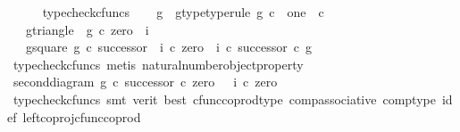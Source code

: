 \begin{isabellebody}
\ \ \ \ \isamarkupfalse%
\ typecheck{\isacharunderscore}{\kern0pt}cfuncs\isanewline
\ \ \isamarkupfalse%
\ g\ \ g{\isacharunderscore}{\kern0pt}type{\isacharbrackleft}{\kern0pt}type{\isacharunderscore}{\kern0pt}rule{\isacharbrackright}{\kern0pt}{\isacharcolon}{\kern0pt}\ {\isachardoublequoteopen}g{\isacharcolon}{\kern0pt}\ {\isasymnat}\isactrlsub c\ {\isasymrightarrow}\ {\isacharparenleft}{\kern0pt}one\ {\isasymCoprod}\ {\isasymnat}\isactrlsub c{\isacharparenright}{\kern0pt}{\isachardoublequoteclose}\ \isanewline
\ \ \ g{\isacharunderscore}{\kern0pt}triangle{\isacharcolon}{\kern0pt}\ {\isachardoublequoteopen}\ g\ {\isasymcirc}\isactrlsub c\ zero\ {\isacharequal}{\kern0pt}\ i{}{\isachardoublequoteclose}\ \isanewline
\ \ \ g{\isacharunderscore}{\kern0pt}square{\isacharcolon}{\kern0pt}\ {\isachardoublequoteopen}g\ {\isasymcirc}\isactrlsub c\ successor\ {\isacharequal}{\kern0pt}\ {\isacharparenleft}{\kern0pt}{\isacharparenleft}{\kern0pt}i{}\ {\isasymcirc}\isactrlsub c\ zero{\isacharparenright}{\kern0pt}\ {\isasymamalg}\ {\isacharparenleft}{\kern0pt}i{}\ {\isasymcirc}\isactrlsub c\ successor{\isacharparenright}{\kern0pt}{\isacharparenright}{\kern0pt}\ {\isasymcirc}\isactrlsub c\ g{\isachardoublequoteclose}\isanewline
\ \ \ \ \isamarkupfalse%
\ {\isacharparenleft}{\kern0pt}typecheck{\isacharunderscore}{\kern0pt}cfuncs{\isacharcomma}{\kern0pt}\ metis\ natural{\isacharunderscore}{\kern0pt}number{\isacharunderscore}{\kern0pt}object{\isacharunderscore}{\kern0pt}property{\isacharparenright}{\kern0pt}\isanewline
\ \ \isamarkupfalse%
\ \isamarkupfalse%
\ second{\isacharunderscore}{\kern0pt}diagram{}{\isacharcolon}{\kern0pt}\ {\isachardoublequoteopen}g\ {\isasymcirc}\isactrlsub c\ {\isacharparenleft}{\kern0pt}successor\ {\isasymcirc}\isactrlsub c\ zero{\isacharparenright}{\kern0pt}\ \ {\isacharequal}{\kern0pt}\ {\isacharparenleft}{\kern0pt}i{}\ {\isasymcirc}\isactrlsub c\ zero{\isacharparenright}{\kern0pt}{\isachardoublequoteclose}\isanewline
\ \ \ \ \isamarkupfalse%
\ {\isacharparenleft}{\kern0pt}typecheck{\isacharunderscore}{\kern0pt}cfuncs{\isacharcomma}{\kern0pt}\ smt\ {\isacharparenleft}{\kern0pt}verit{\isacharcomma}{\kern0pt}\ best{\isacharparenright}{\kern0pt}\ cfunc{\isacharunderscore}{\kern0pt}coprod{\isacharunderscore}{\kern0pt}type\ comp{\isacharunderscore}{\kern0pt}associative{}\ comp{\isacharunderscore}{\kern0pt}type\ i{}{\isacharunderscore}{\kern0pt}def\ left{\isacharunderscore}{\kern0pt}coproj{\isacharunderscore}{\kern0pt}cfunc{\isacharunderscore}{\kern0pt}coprod{\isacharparenright}{\kern0pt}\isanewline

\end{isabellebody}
